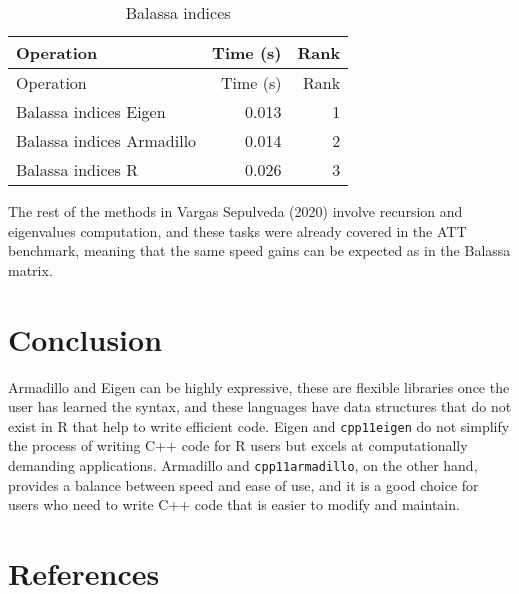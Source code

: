 \documentclass[12pt]{article}
\begin{document}
\begin{longtable}[]{@{}lrr@{}}
\caption{Balassa indices}\tabularnewline
\toprule\noalign{}
Operation & Time (s) & Rank \\
\midrule\noalign{}
\endfirsthead
\toprule\noalign{}
Operation & Time (s) & Rank \\
\midrule\noalign{}
\endhead
\bottomrule\noalign{}
\endlastfoot
Balassa indices Eigen & 0.013 & 1 \\
Balassa indices Armadillo & 0.014 & 2 \\
Balassa indices R & 0.026 & 3 \\
\end{longtable}

The rest of the methods in Vargas Sepulveda (2020) involve recursion and
eigenvalues computation, and these tasks were already covered in the ATT
benchmark, meaning that the same speed gains can be expected as in the
Balassa matrix.

\section{Conclusion}\label{conclusion}

Armadillo and Eigen can be highly expressive, these are flexible
libraries once the user has learned the syntax, and these languages have
data structures that do not exist in R that help to write efficient
code. Eigen and \texttt{cpp11eigen} do not simplify the process of
writing C++ code for R users but excels at computationally demanding
applications. Armadillo and \texttt{cpp11armadillo}, on the other hand,
provides a balance between speed and ease of use, and it is a good
choice for users who need to write C++ code that is easier to modify and
maintain.

\section*{References}\label{references}
\end{document}
